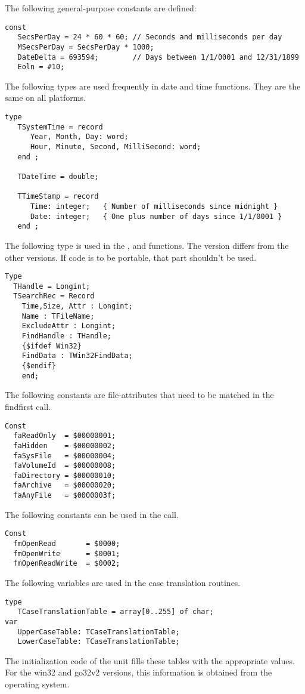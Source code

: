 The following general-purpose constants are defined:
\begin{verbatim}
const
   SecsPerDay = 24 * 60 * 60; // Seconds and milliseconds per day
   MSecsPerDay = SecsPerDay * 1000;
   DateDelta = 693594;        // Days between 1/1/0001 and 12/31/1899
   Eoln = #10;
\end{verbatim}
The following types are used frequently in date and time functions.
They are the same on all platforms.
\begin{verbatim}
type
   TSystemTime = record
      Year, Month, Day: word;
      Hour, Minute, Second, MilliSecond: word;
   end ;

   TDateTime = double;

   TTimeStamp = record
      Time: integer;   { Number of milliseconds since midnight }
      Date: integer;   { One plus number of days since 1/1/0001 }
   end ;
\end{verbatim}
The following type is used in the , 
and  functions. The  version differs from 
the other versions. If code is to be portable, that part  shouldn't 
be used.
\begin{verbatim}
Type 
  THandle = Longint; 
  TSearchRec = Record
    Time,Size, Attr : Longint;
    Name : TFileName;
    ExcludeAttr : Longint;
    FindHandle : THandle;
    {$ifdef Win32}
    FindData : TWin32FindData;        
    {$endif}
    end;
\end{verbatim}
The following constants are file-attributes that need to be matched in the 
findfirst call.
\begin{verbatim}
Const 
  faReadOnly  = $00000001; 
  faHidden    = $00000002;
  faSysFile   = $00000004;
  faVolumeId  = $00000008;
  faDirectory = $00000010;
  faArchive   = $00000020;
  faAnyFile   = $0000003f;
\end{verbatim}
The following constants can be used in the  call.
\begin{verbatim}
Const
  fmOpenRead       = $0000;
  fmOpenWrite      = $0001;
  fmOpenReadWrite  = $0002;
\end{verbatim}
The following variables are used in the case translation routines.
\begin{verbatim}
type
   TCaseTranslationTable = array[0..255] of char;
var
   UpperCaseTable: TCaseTranslationTable;
   LowerCaseTable: TCaseTranslationTable;
\end{verbatim}
The initialization code of the  unit fills these 
tables with the appropriate values. For the win32 and go32v2
versions, this information is obtained from the operating system.

